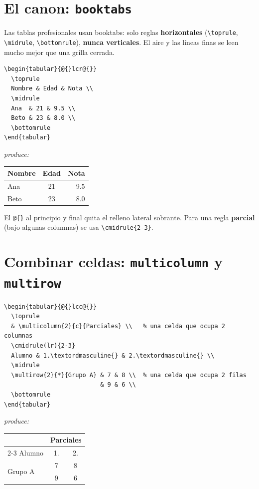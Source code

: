 \documentclass[11pt,a4paper]{article}
\newcommand{\C}[1]{\texttt{\textbackslash #1}}
\newcommand{\pkg}[1]{\textsf{#1}}
\newcommand{\produce}{\par\smallskip\noindent\textit{produce:}\par\smallskip}
\begin{document}
\section{El canon: \texttt{booktabs}}
Las tablas profesionales usan \pkg{booktabs}: solo reglas \textbf{horizontales}
(\C{toprule}, \C{midrule}, \C{bottomrule}), \textbf{nunca verticales}. El aire y
las líneas finas se leen mucho mejor que una grilla cerrada.
\begin{lstlisting}
\begin{tabular}{@{}lcr@{}}
  \toprule
  Nombre & Edad & Nota \\
  \midrule
  Ana  & 21 & 9.5 \\
  Beto & 23 & 8.0 \\
  \bottomrule
\end{tabular}
\end{lstlisting}
\produce
\begin{center}
\begin{tabular}{@{}lcr@{}}
  \toprule
  Nombre & Edad & Nota \\
  \midrule
  Ana  & 21 & 9.5 \\
  Beto & 23 & 8.0 \\
  \bottomrule
\end{tabular}
\end{center}
\noindent El \texttt{@\{\}} al principio y final quita el relleno lateral
sobrante. Para una regla \textbf{parcial} (bajo algunas columnas) se usa
\C{cmidrule\{2-3\}}.

\section{Combinar celdas: \texttt{multicolumn} y \texttt{multirow}}
\begin{lstlisting}
\begin{tabular}{@{}lcc@{}}
  \toprule
  & \multicolumn{2}{c}{Parciales} \\   % una celda que ocupa 2 columnas
  \cmidrule(lr){2-3}
  Alumno & 1.\textordmasculine{} & 2.\textordmasculine{} \\
  \midrule
  \multirow{2}{*}{Grupo A} & 7 & 8 \\  % una celda que ocupa 2 filas
                           & 9 & 6 \\
  \bottomrule
\end{tabular}
\end{lstlisting}
\produce
\begin{center}
\begin{tabular}{@{}lcc@{}}
  \toprule
  & \multicolumn{2}{c}{Parciales} \\
  \cmidrule(lr){2-3}
  Alumno & 1.\textordmasculine{} & 2.\textordmasculine{} \\
  \midrule
  \multirow{2}{*}{Grupo A} & 7 & 8 \\
                           & 9 & 6 \\
  \bottomrule
\end{tabular}
\end{center}
\end{document}
